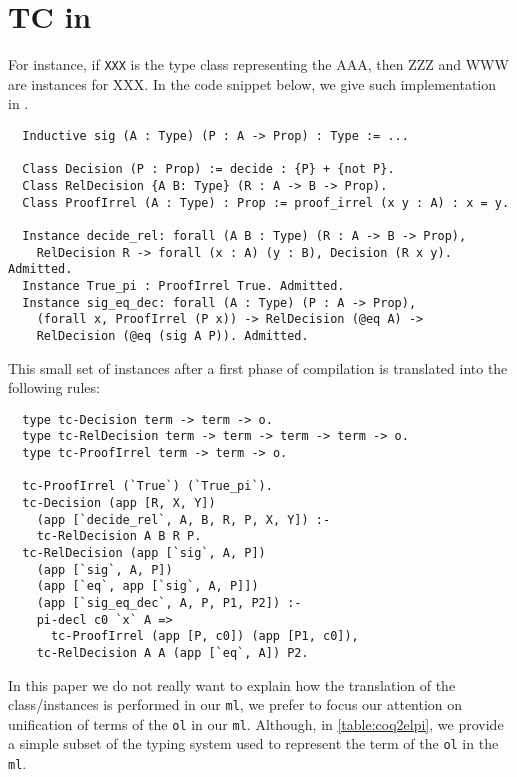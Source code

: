 \documentclass[sigconf,natbib=false]{acmart}
\def\elpi{\proglang{elpi}}
\def\coq{\proglang{coq}}
\newcommand*{\acronym}[1]{\texttt{#1}\xspace}
\def\ol{\acronym{ol}} %
\def\ml{\acronym{ml}} %
\begin{document}
\section{TC in \coq}
For instance, if
\texttt{XXX} is the type class representing the AAA, then ZZZ and WWW are
instances for XXX. In the code snippet below, we give such implementation in
\coq. 

\begin{verbatim}
  Inductive sig (A : Type) (P : A -> Prop) : Type := ...

  Class Decision (P : Prop) := decide : {P} + {not P}.
  Class RelDecision {A B: Type} (R : A -> B -> Prop).
  Class ProofIrrel (A : Type) : Prop := proof_irrel (x y : A) : x = y.

  Instance decide_rel: forall (A B : Type) (R : A -> B -> Prop),
    RelDecision R -> forall (x : A) (y : B), Decision (R x y). Admitted.
  Instance True_pi : ProofIrrel True. Admitted.
  Instance sig_eq_dec: forall (A : Type) (P : A -> Prop),
    (forall x, ProofIrrel (P x)) -> RelDecision (@eq A) ->
    RelDecision (@eq (sig A P)). Admitted.
\end{verbatim}

This small set of instances after a first phase of compilation is translated into the following \elpi rules:

\begin{verbatim}
  type tc-Decision term -> term -> o.
  type tc-RelDecision term -> term -> term -> term -> o.
  type tc-ProofIrrel term -> term -> o.

  tc-ProofIrrel (`True`) (`True_pi`).
  tc-Decision (app [R, X, Y]) 
    (app [`decide_rel`, A, B, R, P, X, Y]) :-
    tc-RelDecision A B R P.
  tc-RelDecision (app [`sig`, A, P]) 
    (app [`sig`, A, P]) 
    (app [`eq`, app [`sig`, A, P]]) 
    (app [`sig_eq_dec`, A, P, P1, P2]) :-
    pi-decl c0 `x` A =>
      tc-ProofIrrel (app [P, c0]) (app [P1, c0]), 
    tc-RelDecision A A (app [`eq`, A]) P2.
\end{verbatim}

In this paper we do not really want to explain how the translation of the
class/instances is performed in our \ml, we prefer to focus our attention on
unification of terms of the \ol in our \ml. Although, in \cref{table:coq2elpi},
we provide a simple subset of the typing system used to represent the term of
the \ol in the \ml.
\end{document}

